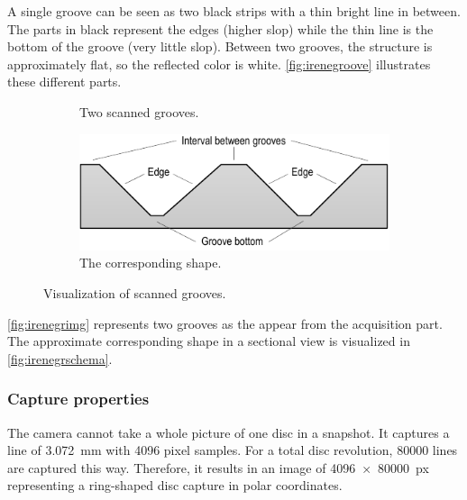 A single groove can be seen as two black strips with a thin bright line in between. The parts in black represent the edges (higher slop) while the thin line is the bottom of the groove (very little slop). Between two grooves, the structure is approximately flat, so the reflected color is white. \autoref{fig:irenegroove} illustrates these different parts.

\begin{figure}[!ht]
\centering
    \begin{subfigure}[t]{0.29\textwidth}
    \centering
    \caption{Two scanned grooves.}
    \label{fig:irenegrimg}
    \end{subfigure}
    \begin{subfigure}[t]{0.7\textwidth}
    \centering
    \includegraphics[width=9.5cm]{images/irene-grooves-schema}
    \caption{The corresponding shape.}
    \label{fig:irenegrschema}
    \end{subfigure}
    \caption{Visualization of scanned grooves.}
    \label{fig:irenegroove}
\end{figure}

\autoref{fig:irenegrimg} represents two grooves as the appear from the acquisition part. The approximate corresponding shape in a sectional view is visualized in \autoref{fig:irenegrschema}.

\subsubsection{Capture properties}

The camera cannot take a whole picture of one disc in a snapshot. It captures a line of \SI{3.072}{\milli\metre} with \num{4096} pixel samples. For a total disc revolution, \num{80000} lines are captured this way. Therefore, it results in an image of \SI[product-units=single]{4096x80000}{px} representing a ring-shaped disc capture in polar coordinates.

